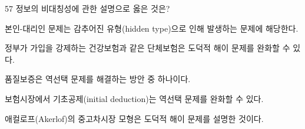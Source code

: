 \begin{question}{57}
정보의 비대칭성에 관한 설명으로 옳은 것은?
\begin{choices}
  \item 본인-대리인 문제는 감추어진 유형(hidden type)으로 인해 발생하는 문제에 해당한다.
  \item 정부가 가입을 강제하는 건강보험과 같은 단체보험은 도덕적 해이 문제를 완화할 수 있다.
  \item 품질보증은 역선택 문제를 해결하는 방안 중 하나이다.
  \item 보험시장에서 기초공제(initial deduction)는 역선택 문제를 완화할 수 있다.
  \item 애컬로프(Akerlof)의 중고차시장 모형은 도덕적 해이 문제를 설명한 것이다.
\end{choices}
\end{question}
